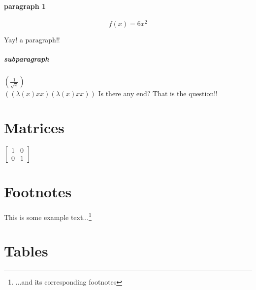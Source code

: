 \documentclass{article}
\begin{document}
\paragraph{paragraph 1}

\begin{equation*}
 f(x) = 6x^2
\end{equation*}

Yay! a paragraph!!

\subparagraph{subparagraph}

$\left(\frac{1}{\sqrt{x}}\right)$\\
$\left(\left(\lambda\left(x\right)xx\right)\left(\lambda\left(x\right)xx\right)\right)$
Is there any end? That is the question!!

\section{Matrices}

$\left[
  \begin{matrix}
   1 & 0 \\
   0 & 1
  \end{matrix}
  \right]$

\section{Footnotes}

This is some example text...\footnote{\label{myfootnote}...and its corresponding footnotes}

\section{Tables}
\end{document}
